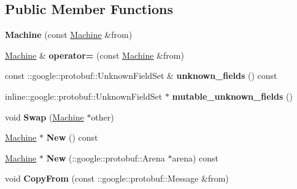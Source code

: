 \subsection*{Public Member Functions}
\begin{DoxyCompactItemize}
\item 
{\bfseries Machine} (const \hyperlink{classmachines_1_1Machine}{Machine} \&from)\hypertarget{classmachines_1_1Machine_a4bc25165182e6a979ef514463749076e}{}\label{classmachines_1_1Machine_a4bc25165182e6a979ef514463749076e}

\item 
\hyperlink{classmachines_1_1Machine}{Machine} \& {\bfseries operator=} (const \hyperlink{classmachines_1_1Machine}{Machine} \&from)\hypertarget{classmachines_1_1Machine_a446fbdac340914a6706dfe3251d7e9f7}{}\label{classmachines_1_1Machine_a446fbdac340914a6706dfe3251d7e9f7}

\item 
const \+::google\+::protobuf\+::\+Unknown\+Field\+Set \& {\bfseries unknown\+\_\+fields} () const \hypertarget{classmachines_1_1Machine_a253de277819734acf7ddc3669626fe0c}{}\label{classmachines_1_1Machine_a253de277819734acf7ddc3669626fe0c}

\item 
inline\+::google\+::protobuf\+::\+Unknown\+Field\+Set $\ast$ {\bfseries mutable\+\_\+unknown\+\_\+fields} ()\hypertarget{classmachines_1_1Machine_aa44fa140cc57ec8ce33d85d77444570a}{}\label{classmachines_1_1Machine_aa44fa140cc57ec8ce33d85d77444570a}

\item 
void {\bfseries Swap} (\hyperlink{classmachines_1_1Machine}{Machine} $\ast$other)\hypertarget{classmachines_1_1Machine_aa4faae554cfeeb3c4e247822e203186d}{}\label{classmachines_1_1Machine_aa4faae554cfeeb3c4e247822e203186d}

\item 
\hyperlink{classmachines_1_1Machine}{Machine} $\ast$ {\bfseries New} () const \hypertarget{classmachines_1_1Machine_ae21b376d3ca27fb1998a640cf3c5b466}{}\label{classmachines_1_1Machine_ae21b376d3ca27fb1998a640cf3c5b466}

\item 
\hyperlink{classmachines_1_1Machine}{Machine} $\ast$ {\bfseries New} (\+::google\+::protobuf\+::\+Arena $\ast$arena) const \hypertarget{classmachines_1_1Machine_ac68514d217a1622798bb41a662b9cf41}{}\label{classmachines_1_1Machine_ac68514d217a1622798bb41a662b9cf41}

\item 
void {\bfseries Copy\+From} (const \+::google\+::protobuf\+::\+Message \&from)\hypertarget{classmachines_1_1Machine_acea5a9547edd90825e68d4d80e9cb4ed}{}\label{classmachines_1_1Machine_acea5a9547edd90825e68d4d80e9cb4ed}


\end{DoxyCompactItemize}
